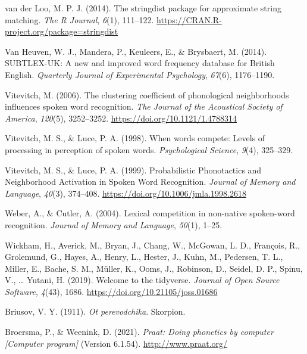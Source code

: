 \documentclass[
]{article}
\newlength{\cslhangindent}
\newenvironment{CSLReferences}[2] %
 {\begin{list}{}{%
  \setlength{\itemindent}{0pt}
  \setlength{\leftmargin}{0pt}
  \setlength{\parsep}{0pt}
  \ifodd #1
   \setlength{\leftmargin}{\cslhangindent}
   \setlength{\itemindent}{-1\cslhangindent}
  \fi
  \setlength{\itemsep}{#2\baselineskip}}}
 {\end{list}}
\begin{document}
\begin{CSLReferences}{1}{0}
van der Loo, M. P. J. (2014). The stringdist package for approximate
string matching. \emph{The R Journal}, \emph{6}(1), 111--122.
\url{https://CRAN.R-project.org/package=stringdist}

Van Heuven, W. J., Mandera, P., Keuleers, E., \& Brysbaert, M. (2014).
{SUBTLEX-UK}: {A} new and improved word frequency database for {British
English}. \emph{Quarterly Journal of Experimental Psychology},
\emph{67}(6), 1176--1190.

Vitevitch, M. (2006). The clustering coefficient of phonological
neighborhoods influences spoken word recognition. \emph{The Journal of
the Acoustical Society of America}, \emph{120}(5), 3252--3252.
\url{https://doi.org/10.1121/1.4788314}

Vitevitch, M. S., \& Luce, P. A. (1998). When words compete: Levels of
processing in perception of spoken words. \emph{Psychological Science},
\emph{9}(4), 325--329.

Vitevitch, M. S., \& Luce, P. A. (1999). Probabilistic {Phonotactics}
and {Neighborhood Activation} in {Spoken Word Recognition}.
\emph{Journal of Memory and Language}, \emph{40}(3), 374--408.
\url{https://doi.org/10.1006/jmla.1998.2618}

Weber, A., \& Cutler, A. (2004). Lexical competition in non-native
spoken-word recognition. \emph{Journal of Memory and Language},
\emph{50}(1), 1--25.

Wickham, H., Averick, M., Bryan, J., Chang, W., McGowan, L. D.,
François, R., Grolemund, G., Hayes, A., Henry, L., Hester, J., Kuhn, M.,
Pedersen, T. L., Miller, E., Bache, S. M., Müller, K., Ooms, J.,
Robinson, D., Seidel, D. P., Spinu, V., \ldots{} Yutani, H. (2019).
Welcome to the tidyverse. \emph{Journal of Open Source Software},
\emph{4}(43), 1686. \url{https://doi.org/10.21105/joss.01686}

Briusov, V. Y. (1911). \emph{Ot perevodchika}. Skorpion.

Broersma, P., \& Weenink, D. (2021). \emph{Praat: Doing phonetics by
computer {[}{Computer} program{]}} (Version 6.1.54).
\url{http://www.praat.org/}


\end{CSLReferences}
\end{document}
